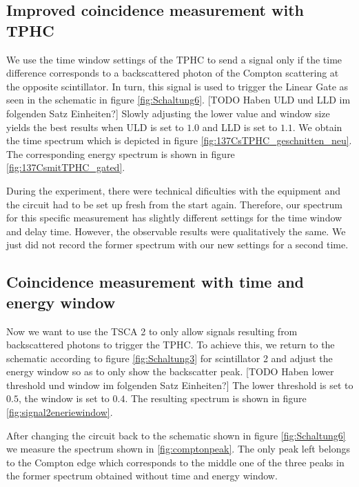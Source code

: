 \subsection{Improved coincidence measurement with TPHC}
%
We use the time window settings of the TPHC to send a signal only if the time difference corresponds to a backscattered photon of the Compton scattering at the opposite scintillator.
In turn, this signal is used to trigger the Linear Gate as seen in the schematic in figure \ref{fig:Schaltung6}.
[TODO Haben ULD und LLD im folgenden Satz Einheiten?] Slowly adjusting the lower value and window size yields the best results when ULD is set to $1.0$ and LLD is set to $1.1$.
We obtain the time spectrum which is depicted in figure \ref{fig:137CsTPHC_geschnitten_neu}.
The corresponding energy spectrum is shown in figure \ref{fig:137CsmitTPHC_gated}.
%
\par
%
During the experiment, there were technical dificulties with the equipment and the circuit had to be set up fresh from the start again.
Therefore, our spectrum for this specific measurement has slightly different settings for the time window and delay time.
However, the observable results were qualitatively the same.
We just did not record the former spectrum with our new settings for a second time.
%
\subsection{Coincidence measurement with time and energy window}
%
Now we want to use the TSCA 2 to only allow signals resulting from backscattered photons to trigger the TPHC.
To achieve this, we return to the schematic according to figure \ref{fig:Schaltung3} for scintillator 2 and adjust the energy window so as to only show the backscatter peak.
[TODO Haben lower threshold und window im folgenden Satz Einheiten?] The lower threshold is set to $0.5$, the window is set to $0.4$.
The resulting spectrum is shown in figure \ref{fig:signal2eneriewindow}.
%
\par
%
After changing the circuit back to the schematic shown in figure \ref{fig:Schaltung6} we measure the spectrum shown in \ref{fig:comptonpeak}.
The only peak left belongs to the Compton edge which corresponds to the middle one of the three peaks in the former spectrum obtained without time and energy window.
%
